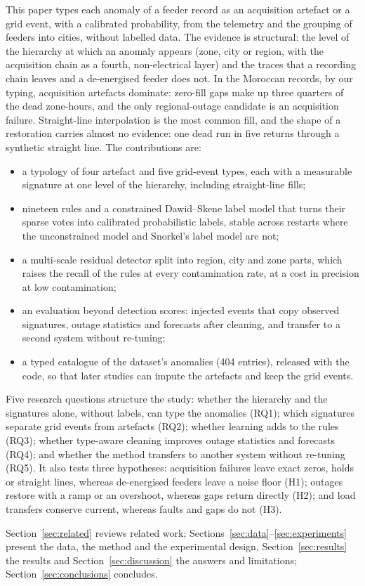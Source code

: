 This paper types each anomaly of a feeder record as an acquisition artefact or a grid event, with a calibrated probability, from the telemetry and the grouping of feeders into cities, without labelled data. The evidence is structural: the level of the hierarchy at which an anomaly appears (zone, city or region, with the acquisition chain as a fourth, non-electrical layer) and the traces that a recording chain leaves and a de-energised feeder does not. In the Moroccan records, by our typing, acquisition artefacts dominate: zero-fill gaps make up three quarters of the dead zone-hours, and the only regional-outage candidate is an acquisition failure. Straight-line interpolation is the most common fill, and the shape of a restoration carries almost no evidence: one dead run in five returns through a synthetic straight line. The contributions are:
\begin{itemize}
\item a typology of four artefact and five grid-event types, each with a measurable signature at one level of the hierarchy, including straight-line fills;
\item nineteen rules and a constrained Dawid--Skene label model that turns their sparse votes into calibrated probabilistic labels, stable across restarts where the unconstrained model and Snorkel's label model are not;
\item a multi-scale residual detector split into region, city and zone parts, which raises the recall of the rules at every contamination rate, at a cost in precision at low contamination;
\item an evaluation beyond detection scores: injected events that copy observed signatures, outage statistics and forecasts after cleaning, and transfer to a second system without re-tuning;
\item a typed catalogue of the dataset's anomalies (404 entries), released with the code, so that later studies can impute the artefacts and keep the grid events.
\end{itemize}

Five research questions structure the study: whether the hierarchy and the signatures alone, without labels, can type the anomalies (RQ1); which signatures separate grid events from artefacts (RQ2); whether learning adds to the rules (RQ3); whether type-aware cleaning improves outage statistics and forecasts (RQ4); and whether the method transfers to another system without re-tuning (RQ5). It also tests three hypotheses: acquisition failures leave exact zeros, holds or straight lines, whereas de-energised feeders leave a noise floor (H1); outages restore with a ramp or an overshoot, whereas gaps return directly (H2); and load transfers conserve current, whereas faults and gaps do not (H3).

Section~\ref{sec:related} reviews related work; Sections~\ref{sec:data}--\ref{sec:experiments} present the data, the method and the experimental design, Section~\ref{sec:results} the results and Section~\ref{sec:discussion} the answers and limitations; Section~\ref{sec:conclusions} concludes.
